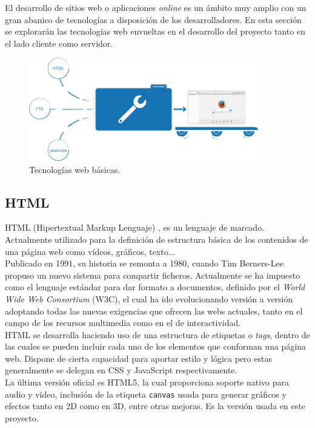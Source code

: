 \documentclass[11pt,a4paper]{book}
\begin{document}
			El desarrollo de sitios web o aplicaciones \textit{online} es un ámbito muy amplio con un gran abanico de tecnologías a disposición de los desarrolladores. En esta sección se explorarán las tecnologías web envueltas en el desarrollo del proyecto tanto en el lado cliente como servidor.
			\begin{figure}[H]
				\centering
				\includegraphics[width=10cm, keepaspectratio]{img/html_css_js.png}
				\caption{Tecnologías web básicas.}
				\label{fig:HTML_CSS_JS}
			\end{figure}
	
			\subsection{HTML}
				HTML (Hipertextual Markup Lenguaje) \cite{HTML}, es un lenguaje de marcado. Actualmente utilizado para la definición de  estructura básica de los contenidos de una página web como vídeos, gráficos, texto... \\
				
				Publicado en 1991, su historia se remonta a 1980, cuando Tim Berners-Lee propuso un nuevo sistema para compartir ficheros. Actualmente se ha impuesto como el lenguaje estándar para dar formato a documentos, definido por el \textit{World Wide Web Consortium} (W3C), el cual ha ido evolucionando versión a versión adoptando todas las nuevas exigencias que ofrecen las webs actuales, tanto en el campo de los recursos multimedia como en el de interactividad.\\
				
				HTML se desarrolla haciendo uso de una estructura de etiquetas o \textit{tags}, dentro de las cuales se pueden incluir cada uno de los elementos que conforman una página web. Dispone de cierta capacidad para aportar estilo y lógica pero estas generalmente se delegan en CSS y JavaScript respectivamente.\\
				
				La última versión oficial es HTML5, la cual proporciona soporte nativo para audio y vídeo, inclusión de la etiqueta \texttt{canvas} usada para generar gráficos y efectos tanto en 2D como en 3D, entre otras mejoras. Es la versión usada en este proyecto.
				
\end{document}
